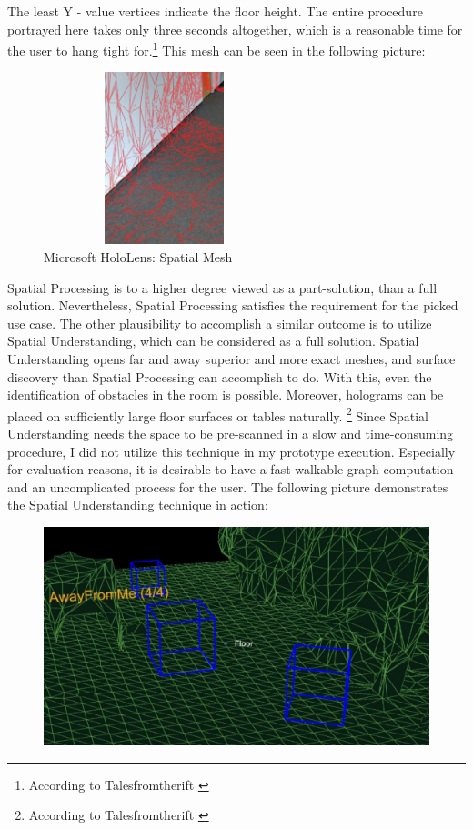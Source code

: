 \documentclass[12pt,a4paper,oneside,american,parskip=half]{article}
\begin{document}
\begin{justify}
\begin{normalsize}
The least Y - value vertices indicate the floor height.
The entire procedure portrayed here takes only three seconds altogether, which is a reasonable time for the user to hang tight for.\footnote{According to Talesfromtherift \cite{understanding}}
\newline
This mesh can be seen in the following picture:
\begin{figure}[h!]
\centering
\includegraphics[width= 7cm, height = 5cm]{redmesh.jpg}
\caption{Microsoft HoloLens: Spatial Mesh}
\end{figure}
\newline
Spatial Processing is to a higher degree viewed as a part-solution, than a full solution. Nevertheless, Spatial Processing satisfies the requirement for the picked use case. The other plausibility to accomplish a similar outcome is to utilize Spatial Understanding, which can be considered as a full solution.
\newline
Spatial Understanding opens far and away superior and more exact meshes, and surface discovery than Spatial Processing can accomplish to do. With this, even the identification of obstacles in the room is possible. Moreover, holograms can be placed on sufficiently large floor surfaces or tables naturally. \footnote{According to Talesfromtherift \cite{understanding}}
\newline
Since Spatial Understanding needs the space to be pre-scanned in a slow and time-consuming procedure, I did not utilize this technique in my prototype execution.
Especially for evaluation reasons, it is desirable to have a fast walkable graph computation and an uncomplicated process for the user.
The following picture demonstrates the Spatial Understanding technique in action:
\begin{figure}[h!]
\includegraphics[width= 10 cm]{understanding.jpg}

\end{figure}
\end{normalsize}
\end{justify}
\end{document}
